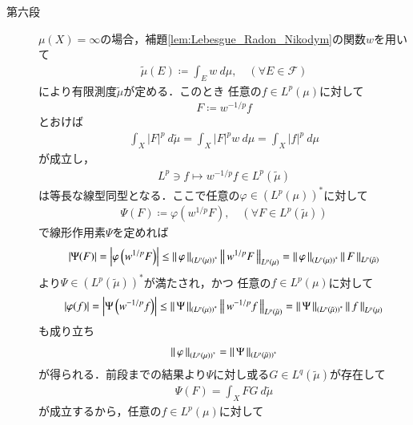 \begin{prf}
\begin{description}
			\item[第六段]
				$\mu(X) = \infty$の場合，補題\ref{lem:Lebesgue_Radon_Nikodym}の関数$w$を用いて
				\begin{align}
					\tilde{\mu}(E) \coloneqq \int_E w\ d\mu,
					\quad (\forall E \in \mathscr{F})
				\end{align}
				により有限測度$\tilde{\mu}$が定める．このとき
				任意の$f \in L^p(\mu)$に対して
				\begin{align}
					F \coloneqq w^{-1/p} f
				\end{align}
				とおけば
				\begin{align}
					\int_X |F|^p\ d\tilde{\mu} = \int_X |F|^p w\ d\mu = \int_X |f|^p\ d\mu
					\label{eq:thm_dual_space_of_L_p_6}
				\end{align}
				が成立し，
				\begin{align}
					L^p \ni f \longmapsto w^{-1/p} f \in L^p(\tilde{\mu})
				\end{align}
				は等長な線型同型となる．ここで任意の$\varphi \in \left( L^p(\mu) \right)^*$に対して
				\begin{align}
					\Psi(F) \coloneqq \varphi\left( w^{1/p} F \right),
					\quad (\forall F \in L^p(\tilde{\mu}))
				\end{align}
				で線形作用素$\Psi$を定めれば
				\begin{align}
					\left| \Psi(F) \right| = \left| \varphi\left( w^{1/p} F \right) \right|
					\leq \left\|\, \varphi\, \right\|_{\left( L^p(\mu) \right)^*}\left\|\, w^{1/p} F\, \right\|_{L^p(\mu)}
					= \left\|\, \varphi\, \right\|_{\left( L^p(\mu) \right)^*}\left\|\, F\, \right\|_{L^p(\tilde{\mu})}
				\end{align}
				より$\Psi \in \left( L^p(\tilde{\mu}) \right)^*$が満たされ，かつ
				任意の$f \in L^p(\mu)$に対して
				\begin{align}
					\left| \varphi(f) \right| = \left| \Psi\left( w^{-1/p} f \right) \right|
					\leq \left\|\, \Psi\, \right\|_{\left( L^p(\mu) \right)^*}\left\|\, w^{-1/p} f\, \right\|_{L^p(\tilde{\mu})}
					= \left\|\, \Psi\, \right\|_{\left( L^p(\tilde{\mu}) \right)^*}\left\|\, f\, \right\|_{L^p(\mu)}
				\end{align}
				も成り立ち
				\begin{align}
					\left\|\, \varphi\, \right\|_{\left( L^p(\mu) \right)^*} = \left\|\, \Psi\, \right\|_{\left( L^p(\tilde{\mu}) \right)^*}
				\end{align}
				が得られる．前段までの結果より$\Psi$に対し或る$G \in L^q(\tilde{\mu})$が存在して
				\begin{align}
					\Psi(F) = \int_X FG\ d\tilde{\mu}
				\end{align}
				が成立するから，任意の$f \in L^p(\mu)$に対して

\end{description}
\end{prf}
